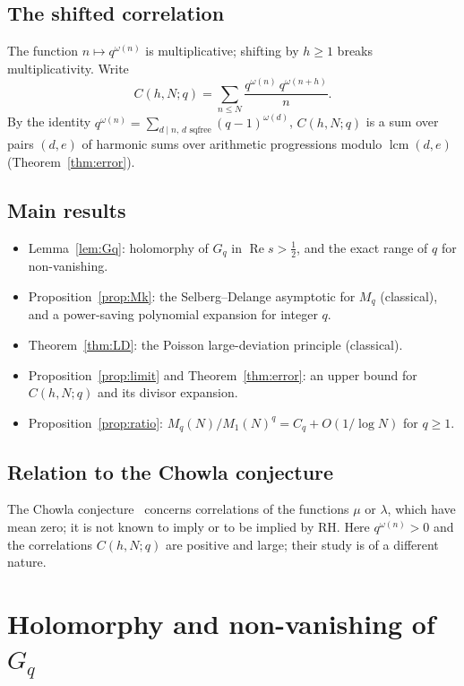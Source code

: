 \documentclass[11pt]{amsart}
\theoremstyle{definition}
\theoremstyle{remark}
\renewcommand{\Re}{\operatorname{Re}}
\newcommand{\half}{\tfrac12}
\newcommand{\om}{\omega}
\begin{document}
\subsection*{The shifted correlation}

The function $n\mapsto q^{\om(n)}$ is multiplicative; shifting by $h\ge 1$ breaks
multiplicativity.  Write
\[
  C(h,N;q) = \sum_{n\le N}\frac{q^{\om(n)}\,q^{\om(n+h)}}{n}.
\]
By the identity $q^{\om(n)}=\sum_{d\mid n,\,d\text{ sqfree}}(q-1)^{\om(d)}$, $C(h,N;q)$ is a
sum over pairs $(d,e)$ of harmonic sums over arithmetic progressions modulo
$\operatorname{lcm}(d,e)$ (Theorem~\ref{thm:error}).

\subsection*{Main results}

\begin{itemize}
\item Lemma~\ref{lem:Gq}: holomorphy of $G_q$ in $\Re s>\half$, and the exact range of
  $q$ for non-vanishing.
\item Proposition~\ref{prop:Mk}: the Selberg--Delange asymptotic for $M_q$ (classical),
  and a power-saving polynomial expansion for integer $q$.
\item Theorem~\ref{thm:LD}: the Poisson large-deviation principle (classical).
\item Proposition~\ref{prop:limit} and Theorem~\ref{thm:error}: an upper bound for
  $C(h,N;q)$ and its divisor expansion.
\item Proposition~\ref{prop:ratio}: $M_q(N)/M_1(N)^q=C_q+O(1/\log N)$ for $q\ge1$.
\end{itemize}

\subsection*{Relation to the Chowla conjecture}

The Chowla conjecture~\cite{C65,E94} concerns correlations of the functions $\mu$ or
$\lambda$, which have mean zero; it is not known to imply or to be implied by RH.  Here
$q^{\om(n)}>0$ and the correlations $C(h,N;q)$ are positive and large; their study is of a
different nature.

\section{Holomorphy and non-vanishing of $G_q$}
\label{sec:Gq}
\end{document}
